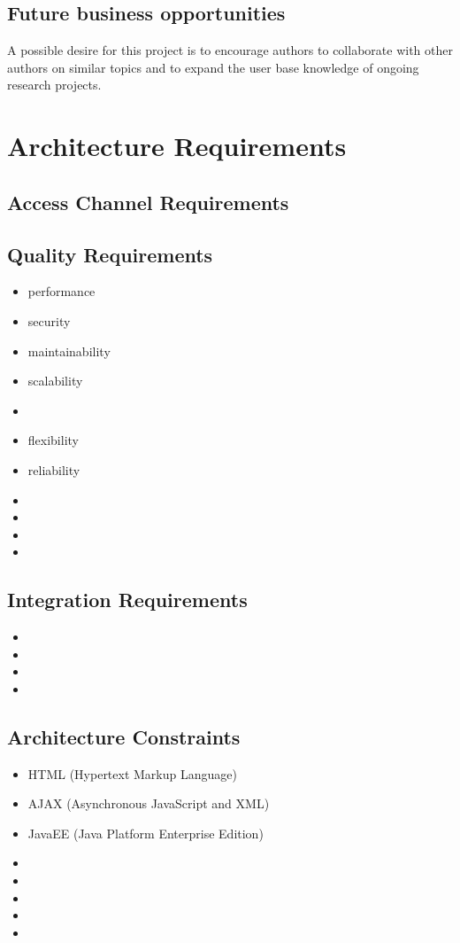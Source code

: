 \documentclass[a4paper]{article}
\begin{document}
\subsection{Future business opportunities}
A possible desire for this project is to encourage authors to collaborate with other authors on similar topics and to expand the user base knowledge of ongoing research projects.

\section{Architecture Requirements}
\subsection{Access Channel Requirements}
\subsection{Quality Requirements}
\begin{itemize}
	\item performance
	\item security
	\item maintainability
	\item scalability
	\item 
	\item flexibility
	\item reliability
	\item 
	\item 
	\item 
	\item 
\end{itemize}

\subsection{Integration Requirements}


\begin{itemize}
	\item 
	\item 
	\item 
	\item 
\end{itemize}

\subsection{Architecture Constraints}

\begin{itemize}
	\item HTML (Hypertext Markup Language)
	\item AJAX (Asynchronous JavaScript and XML)
	\item JavaEE (Java Platform Enterprise Edition)
	\item 
	\item 
	\item 
	\item 
	\item 
	
\end{itemize}
\end{document}
